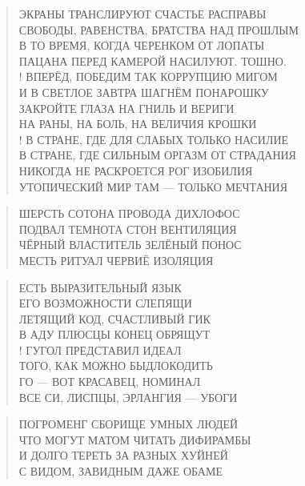\poemtitle{***}
\begin{verse}
ЭКРАНЫ ТРАНСЛИРУЮТ СЧАСТЬЕ РАСПРАВЫ\\
СВОБОДЫ, РАВЕНСТВА, БРАТСТВА НАД ПРОШЛЫМ\\
В ТО ВРЕМЯ, КОГДА ЧЕРЕНКОМ ОТ ЛОПАТЫ\\
ПАЦАНА ПЕРЕД КАМЕРОЙ НАСИЛУЮТ. ТОШНО.\\!
ВПЕРЁД, ПОБЕДИМ ТАК КОРРУПЦИЮ МИГОМ\\
И В СВЕТЛОЕ ЗАВТРА ШАГНЁМ ПОНАРОШКУ\\
ЗАКРОЙТЕ ГЛАЗА НА ГНИЛЬ И ВЕРИГИ\\
НА РАНЫ, НА БОЛЬ, НА ВЕЛИЧИЯ КРОШКИ\\!
В СТРАНЕ, ГДЕ ДЛЯ СЛАБЫХ ТОЛЬКО НАСИЛИЕ\\
В СТРАНЕ, ГДЕ СИЛЬНЫМ ОРГАЗМ ОТ СТРАДАНИЯ\\
НИКОГДА НЕ РАСКРОЕТСЯ РОГ ИЗОБИЛИЯ\\
УТОПИЧЕСКИЙ МИР ТАМ — ТОЛЬКО МЕЧТАНИЯ
\end{verse}

\poemtitle{***}
\begin{verse}
ШЕРСТЬ СОТОНА ПРОВОДА ДИХЛОФОС\\
ПОДВАЛ ТЕМНОТА СТОН ВЕНТИЛЯЦИЯ\\
ЧЁРНЫЙ ВЛАСТИТЕЛЬ ЗЕЛЁНЫЙ ПОНОС\\
МЕСТЬ РИТУАЛ ЧЕРВИЁ ИЗОЛЯЦИЯ
\end{verse}

\poemtitle{***}
\begin{verse}
ЕСТЬ ВЫРАЗИТЕЛЬНЫЙ ЯЗЫК\\
ЕГО ВОЗМОЖНОСТИ СЛЕПЯЩИ\\
ЛЕТЯЩИЙ КОД, СЧАСТЛИВЫЙ ГИК\\
В АДУ ПЛЮСЦЫ КОНЕЦ ОБРЯЩУТ\\!
ГУГОЛ ПРЕДСТАВИЛ ИДЕАЛ\\
ТОГО, КАК МОЖНО БЫДЛОКОДИТЬ\\
ГО — ВОТ КРАСАВЕЦ, НОМИНАЛ\\
ВСЕ СИ, ЛИСПЦЫ, ЭРЛАНГИЯ — УБОГИ
\end{verse}

\poemtitle{***}
\begin{verse}
ПОГРОМЕНГ СБОРИЩЕ УМНЫХ ЛЮДЕЙ\\
ЧТО МОГУТ МАТОМ ЧИТАТЬ ДИФИРАМБЫ\\
И ДОЛГО ТЕРЕТЬ ЗА РАЗНЫХ ХУЙНЕЙ\\
С ВИДОМ, ЗАВИДНЫМ ДАЖЕ ОБАМЕ
\end{verse}


